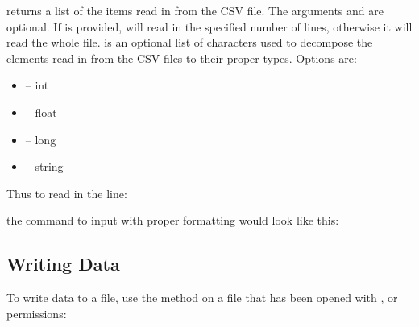 \documentclass[a4paper,10pt,openany,english]{sphinxmanual}
\begin{document}
 returns a list of the items read in from the CSV file. The arguments  and  are optional. If  is provided,  will read in the specified number of lines, otherwise it will read the whole file.  is an optional list of characters used to decompose the elements read in from the CSV files to their proper types. Options are:
\begin{itemize}
\item {} 
 -- int

\item {} 
 -- float

\item {} 
 -- long

\item {} 
 -- string

\end{itemize}

Thus to read in the line:


the command to input with proper formatting would look like this:

\begin{sphinxVerbatim}[commandchars=\\\{\}]
   \PYG{p}{[}\PYG{p}{]}
\end{sphinxVerbatim}


\subsection{Writing Data}
\label{tutorial:id5}
To write data to a file, use the  method on a file that has been opened with ,  or  permissions:
\end{document}
